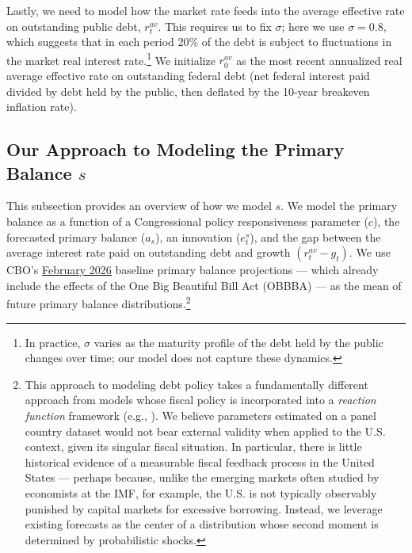 \documentclass[12pt]{article}
\begin{document}
Lastly, we need to model how the market rate feeds into the average effective rate on outstanding public debt, $r^{av}_t$. This requires us to fix $\sigma$; here we use $\sigma = 0.8$, which suggests that in each period 20\% of the debt is subject to fluctuations in the market real interest rate.\footnote{In practice, $\sigma$ varies as the maturity profile of the debt held by the public changes over time; our model does not capture these dynamics.} We initialize $r^{av}_0$ as the most recent annualized real average effective rate on outstanding federal debt (net federal interest paid divided by debt held by the public, then deflated by the 10-year breakeven inflation rate). 

\subsection{Our Approach to Modeling the Primary Balance $s$}

This subsection provides an overview of how we model $s$. We model the primary balance as a function of a Congressional policy responsiveness parameter ($c$), the forecasted primary balance ($a_s$), an innovation ($e^s_t$), and the gap between the average interest rate paid on outstanding debt and growth $(r^{av}_t - g_t)$. We use CBO's \href{https://www.cbo.gov/publication/62105}{February 2026} baseline primary balance projections --- which already include the effects of the One Big Beautiful Bill Act (OBBBA) --- as the mean of future primary balance distributions.\footnote{This approach to modeling debt policy takes a fundamentally different approach from models whose fiscal policy is incorporated into a \textit{reaction function} framework (e.g., \textcite{celasun_2006}). We believe parameters estimated on a panel country dataset would not bear external validity when applied to the U.S. context, given its singular fiscal situation. In particular, there is little historical evidence of a measurable fiscal feedback process in the United States --- perhaps because, unlike the emerging markets often studied by economists at the IMF, for example, the U.S. is not typically observably punished by capital markets for excessive borrowing. Instead, we leverage existing forecasts as the center of a distribution whose second moment is determined by probabilistic shocks.}
\end{document}
